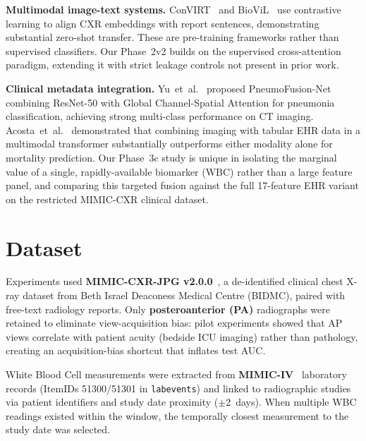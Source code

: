\documentclass[conference]{IEEEtran}
\begin{document}
\textbf{Multimodal image-text systems.} ConVIRT~\cite{zhang2020contrastive} and BioViL~\cite{bannur2023knowledge} use contrastive learning to align CXR embeddings with report sentences, demonstrating substantial zero-shot transfer. These are pre-training frameworks rather than supervised classifiers. Our Phase~2v2 builds on the supervised cross-attention paradigm, extending it with strict leakage controls not present in prior work.

\textbf{Clinical metadata integration.} Yu~et~al.~\cite{frontiers2025pneumofusion} proposed PneumoFusion-Net combining ResNet-50 with Global Channel-Spatial Attention for pneumonia classification, achieving strong multi-class performance on CT imaging. Acosta~et~al.~\cite{acosta2022multimodal} demonstrated that combining imaging with tabular EHR data in a multimodal transformer substantially outperforms either modality alone for mortality prediction. Our Phase~3c study is unique in isolating the marginal value of a single, rapidly-available biomarker (WBC) rather than a large feature panel, and comparing this targeted fusion against the full 17-feature EHR variant on the restricted MIMIC-CXR clinical dataset.

\section{\textcolor{aideep}{Dataset}}

Experiments used \textbf{MIMIC-CXR-JPG v2.0.0}~\cite{johnson2019mimic}, a de-identified clinical chest X-ray dataset from Beth Israel Deaconess Medical Centre (BIDMC), paired with free-text radiology reports. Only \textbf{posteroanterior (PA)} radiographs were retained to eliminate view-acquisition bias: pilot experiments showed that AP views correlate with patient acuity (bedside ICU imaging) rather than pathology, creating an acquisition-bias shortcut that inflates test AUC.

White Blood Cell measurements were extracted from \textbf{MIMIC-IV}~\cite{johnson2023mimiciv} laboratory records (ItemIDs 51300/51301 in \texttt{labevents}) and linked to radiographic studies via patient identifiers and study date proximity ($\pm$2~days). When multiple WBC readings existed within the window, the temporally closest measurement to the study date was selected.
\end{document}
